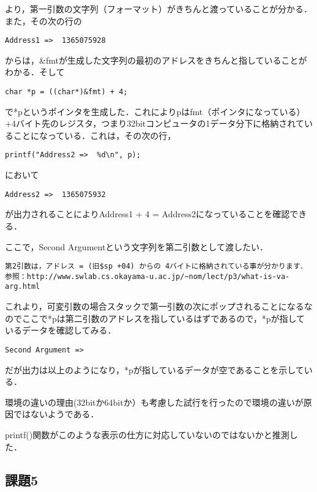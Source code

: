 \documentclass[a4j]{jarticle}
\begin{document}
より，第一引数の文字列（フォーマット）がきちんと渡っていることが分かる．また，その次の行の

\begin{verbatim}
Address1 =>  1365075928
\end{verbatim}

からは，\&fmtが生成した文字列の最初のアドレスをきちんと指していることがわかる．そして

\begin{verbatim}
char *p = ((char*)&fmt) + 4;
\end{verbatim}

で*pというポインタを生成した．これによりpはfmt（ポインタになっている）+4バイト先のレジスタ，つまり32bitコンピュータの1データ分下に格納されていることになっている．これは，その次の行，

\begin{verbatim}
printf("Address2 =>  %d\n", p);
\end{verbatim}

において

\begin{verbatim}
Address2 =>  1365075932
\end{verbatim}

が出力されることによりAddress1 + 4 = Address2になっていることを確認できる．

ここで，Second Argumentという文字列を第二引数として渡したい．

\begin{verbatim}
第2引数は，アドレス = (旧$sp +04) からの 4バイトに格納されている事が分かります．
参照：http://www.swlab.cs.okayama-u.ac.jp/~nom/lect/p3/what-is-va-arg.html
\end{verbatim}

これより，可変引数の場合スタックで第一引数の次にポップされることになるなのでここで*pは第二引数のアドレスを指しているはずであるので，*pが指しているデータを確認してみる．

\begin{verbatim}
Second Argument => 
\end{verbatim}

だが出力は以上のようになり，*pが指しているデータが空であることを示している．

環境の違いの理由(32bitか64bitか）も考慮した試行を行ったので環境の違いが原因ではないようである．

printf()関数がこのような表示の仕方に対応していないのではないかと推測した．


\subsection{課題5}
\end{document}
